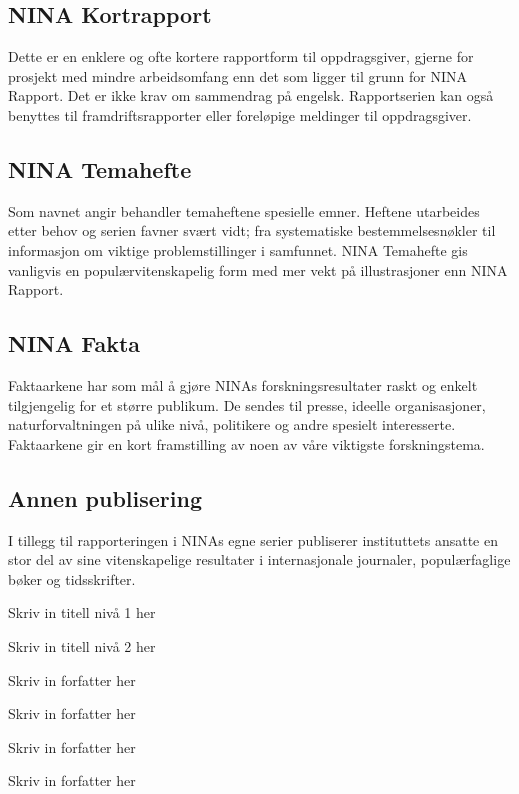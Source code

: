 \documentclass[11pt, a4paper]{article}
\begin{document}
\subsection*{NINA Kortrapport}
Dette er en enklere og ofte kortere rapportform til oppdragsgiver, gjerne for prosjekt med mindre arbeidsomfang enn det som ligger til grunn for NINA Rapport. Det er ikke krav om sammendrag på engelsk. Rapportserien kan også benyttes til framdriftsrapporter eller foreløpige meldinger til oppdragsgiver.

\subsection*{NINA Temahefte}
Som navnet angir behandler temaheftene spesielle emner. Heftene utarbeides etter behov og serien favner svært vidt; fra systematiske bestemmelsesnøkler til informasjon om viktige problemstillinger i samfunnet. NINA Temahefte gis vanligvis en populærvitenskapelig form med mer vekt på illustrasjoner enn NINA Rapport.

\subsection*{NINA Fakta}
Faktaarkene har som mål å gjøre NINAs forskningsresultater raskt og enkelt tilgjengelig for et større publikum. De sendes til presse, ideelle organisasjoner, naturforvaltningen på ulike nivå, politikere og andre spesielt interesserte. Faktaarkene gir en kort framstilling av noen av våre viktigste forskningstema.

\subsection*{Annen publisering}
I tillegg til rapporteringen i NINAs egne serier publiserer instituttets ansatte en stor del av sine vitenskapelige resultater i internasjonale journaler, populærfaglige bøker og tidsskrifter.
\clearpage

\setcounter{page}{1}
\vspace{2cm}

\Huge{Skriv in titell nivå 1 her} \par\vspace{.5cm}
\huge{Skriv in titell nivå 2 her} \par\vspace{1cm}
\hspace{-1cm}\LARGE{Skriv in forfatter her} \par
\hspace{-1cm}\LARGE{Skriv in forfatter her} \par
\hspace{-1cm}\LARGE{Skriv in forfatter her} \par
\hspace{-1cm}\LARGE{Skriv in forfatter her} \par
\end{document}

